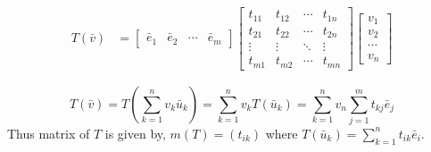 \begin{commentary}
\begin{align*}
	T(\bar{v}) & = \begin{bmatrix} \bar{e}_1 & \bar{e}_2 & \cdots & \bar{e}_m \end{bmatrix} \begin{bmatrix} t_{11} & t_{12} & \cdots & t_{1n} \\ t_{21} & t_{22} & \cdots & t_{2n} \\ \vdots & \vdots & \ddots & \vdots \\ t_{m1} & t_{m2} & \cdots & t_{mn} \end{bmatrix} \begin{bmatrix} v_1 \\ v_2 \\ \cdots \\ v_n  \end{bmatrix} 
\end{align*}
\end{commentary}
\[ T(\bar{v}) = T \left( \sum_{k=1}^n v_k \bar{u}_k \right) = \sum_{k=1}^n v_k T(\bar{u}_k) = \sum_{k=1}^n v_n \sum_{j=1}^m t_{kj}\bar{e}_j \]
Thus matrix of $T$ is given by, $m(T) = (t_{ik})$ where $T(\bar{u}_k) = \sum_{k=1}^n t_{ik}\bar{e}_i$.

